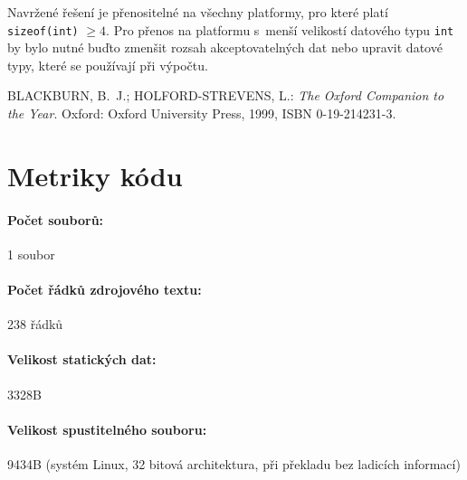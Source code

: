 \documentclass[12pt,a4paper,titlepage,final]{article}
\begin{document}
Navržené řešení je přenositelné na všechny platformy, pro které
platí \texttt{sizeof(int)} $\geq 4$. Pro přenos na platformu s~menší velikostí
datového typu \texttt{int} by bylo nutné buďto zmenšit rozsah akceptovatelných
dat nebo upravit datové typy, které se používají při výpočtu.

\begin{thebibliography}{1}

BLACKBURN, B.~J.; HOLFORD-STREVENS, L.: \emph{The Oxford Companion to the
  Year}. Oxford: Oxford University Press, 1999, ISBN 0-19-214231-3.


\end{thebibliography}
\appendix

\section{Metriky kódu} \label{metriky}
\paragraph{Počet souborů:} 1 soubor
\paragraph{Počet řádků zdrojového textu:} 238 řádků
\paragraph{Velikost statických dat:} 3328B
\paragraph{Velikost spustitelného souboru:} 9434B (systém Linux, 32 bitová
architektura, při překla\-du bez ladicích informací)
\end{document}
